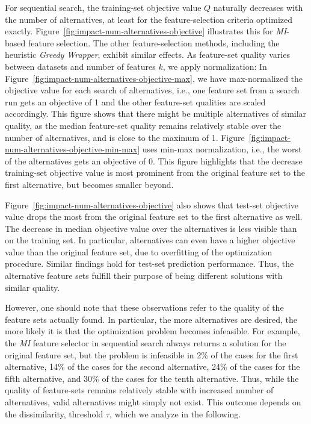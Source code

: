 \documentclass{article}
\theoremstyle{definition}
\begin{document}
For sequential search, the training-set objective value $Q$ naturally decreases with the number of alternatives, at least for the feature-selection criteria optimized exactly.
Figure~\ref{fig:impact-num-alternatives-objective} illustrates this for \emph{MI}-based feature selection.
The other feature-selection methods, including the heuristic \emph{Greedy Wrapper}, exhibit similar effects.
As feature-set quality varies between datasets and number of features $k$, we apply normalization:
In Figure~\ref{fig:impact-num-alternatives-objective-max}, we have max-normalized the objective value for each search of alternatives, i.e., one feature set from a search run gets an objective of 1 and the other feature-set qualities are scaled accordingly.
This figure shows that there might be multiple alternatives of similar quality, as the median feature-set quality remains relatively stable over the number of alternatives, and is close to the maximum of 1.
Figure~\ref{fig:impact-num-alternatives-objective-min-max} uses min-max normalization, i.e., the worst of the alternatives gets an objective of 0.
This figure highlights that the decrease training-set objective value is most prominent from the original feature set to the first alternative, but becomes smaller beyond.

Figure~\ref{fig:impact-num-alternatives-objective} also shows that test-set objective value drops the most from the original feature set to the first alternative as well.
The decrease in median objective value over the alternatives is less visible than on the training set.
In particular, alternatives can even have a higher objective value than the original feature set, due to overfitting of the optimization procedure.
Similar findings hold for test-set prediction performance.
Thus, the alternative feature sets fulfill their purpose of being different solutions with similar quality.

However, one should note that these observations refer to the quality of the feature sets actually found.
In particular, the more alternatives are desired, the more likely it is that the optimization problem becomes infeasible.
For example, the \emph{MI} feature selector in sequential search always returns a solution for the original feature set, but the problem is infeasible in 2\% of the cases for the first alternative, 14\% of the cases for the second alternative, 24\% of the cases for the fifth alternative, and 30\% of the cases for the tenth alternative.
Thus, while the quality of feature-sets remains relatively stable with increased number of alternatives, valid alternatives might simply not exist.
This outcome depends on the dissimilarity, threshold $\tau$, which we analyze in the following.
\end{document}
